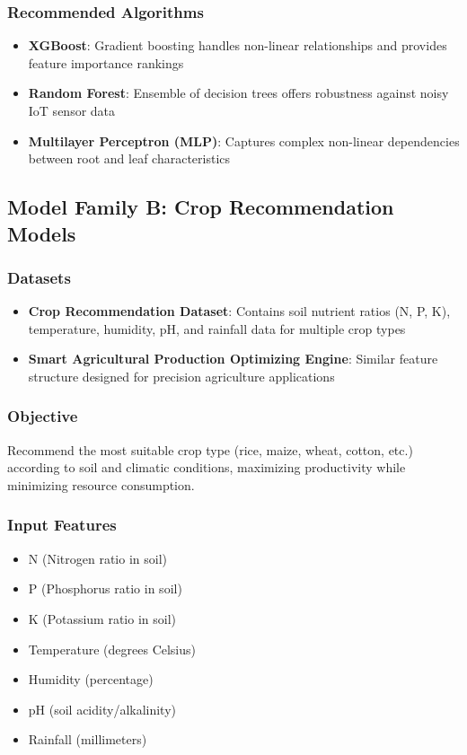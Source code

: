 \documentclass[conference]{IEEEtran}
\begin{document}
\subsubsection{Recommended Algorithms}
\begin{itemize}
\item \textbf{XGBoost}: Gradient boosting handles non-linear relationships and provides feature importance rankings
\item \textbf{Random Forest}: Ensemble of decision trees offers robustness against noisy IoT sensor data
\item \textbf{Multilayer Perceptron (MLP)}: Captures complex non-linear dependencies between root and leaf characteristics
\end{itemize}

\subsection{Model Family B: Crop Recommendation Models}

\subsubsection{Datasets}
\begin{itemize}
\item \textbf{Crop Recommendation Dataset}: Contains soil nutrient ratios (N, P, K), temperature, humidity, pH, and rainfall data for multiple crop types
\item \textbf{Smart Agricultural Production Optimizing Engine}: Similar feature structure designed for precision agriculture applications
\end{itemize}

\subsubsection{Objective}
Recommend the most suitable crop type (rice, maize, wheat, cotton, etc.) according to soil and climatic conditions, maximizing productivity while minimizing resource consumption.

\subsubsection{Input Features}
\begin{itemize}
\item N (Nitrogen ratio in soil)
\item P (Phosphorus ratio in soil)
\item K (Potassium ratio in soil)
\item Temperature (degrees Celsius)
\item Humidity (percentage)
\item pH (soil acidity/alkalinity)
\item Rainfall (millimeters)
\end{itemize}
\end{document}
